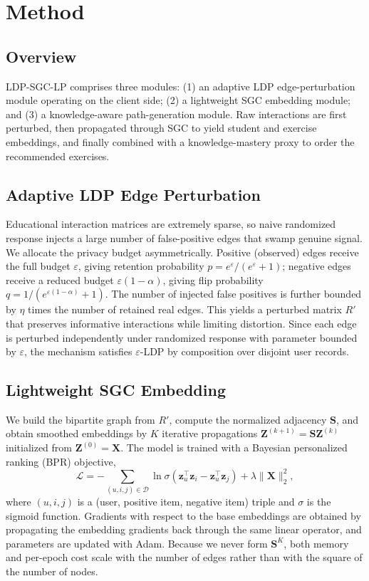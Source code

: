 \documentclass[sn-mathphys]{sn-jnl}
\begin{document}
\section{Method}
\label{sec:method}

\subsection{Overview}
LDP-SGC-LP comprises three modules: (1) an adaptive LDP edge-perturbation module operating on the client side; (2) a lightweight SGC embedding module; and (3) a knowledge-aware path-generation module. Raw interactions are first perturbed, then propagated through SGC to yield student and exercise embeddings, and finally combined with a knowledge-mastery proxy to order the recommended exercises.

\subsection{Adaptive LDP Edge Perturbation}
Educational interaction matrices are extremely sparse, so naive randomized response injects a large number of false-positive edges that swamp genuine signal. We allocate the privacy budget asymmetrically. Positive (observed) edges receive the full budget $\varepsilon$, giving retention probability $p=e^{\varepsilon}/(e^{\varepsilon}+1)$; negative edges receive a reduced budget $\varepsilon(1-\alpha)$, giving flip probability $q=1/(e^{\varepsilon(1-\alpha)}+1)$. The number of injected false positives is further bounded by $\eta$ times the number of retained real edges. This yields a perturbed matrix $R'$ that preserves informative interactions while limiting distortion. Since each edge is perturbed independently under randomized response with parameter bounded by $\varepsilon$, the mechanism satisfies $\varepsilon$-LDP by composition over disjoint user records.

\subsection{Lightweight SGC Embedding}
We build the bipartite graph from $R'$, compute the normalized adjacency $\mathbf{S}$, and obtain smoothed embeddings by $K$ iterative propagations $\mathbf{Z}^{(k+1)}=\mathbf{S}\mathbf{Z}^{(k)}$ initialized from $\mathbf{Z}^{(0)}=\mathbf{X}$. The model is trained with a Bayesian personalized ranking (BPR) objective,
\begin{equation}
\mathcal{L}=-\sum_{(u,i,j)\in\mathcal{D}}\ln\sigma\!\left(\mathbf{z}_u^\top\mathbf{z}_i-\mathbf{z}_u^\top\mathbf{z}_j\right)+\lambda\lVert\mathbf{X}\rVert_2^2,
\end{equation}
where $(u,i,j)$ is a (user, positive item, negative item) triple and $\sigma$ is the sigmoid function. Gradients with respect to the base embeddings are obtained by propagating the embedding gradients back through the same linear operator, and parameters are updated with Adam. Because we never form $\mathbf{S}^{K}$, both memory and per-epoch cost scale with the number of edges rather than with the square of the number of nodes.
\end{document}
